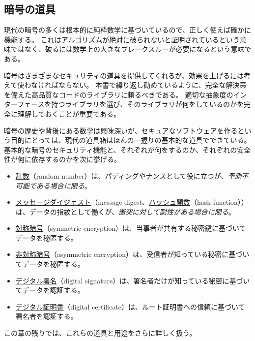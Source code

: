 \documentclass[uplatex]{jsarticle}
\def\label#1{}%
\begin{document}
\subsection{暗号の道具}

現代の暗号の多くは根本的に純粋数学に基づいているので、正しく使えば確かに機能する。
これはアルゴリズムが絶対に破られないと証明されているという意味ではなく、破るには数学上の大きなブレークスルーが必要になるという意味である。

暗号はさまざまなセキュリティの道具を提供してくれるが、効果を上げるには考えて使わなければならない。
本書で繰り返し勧めているように、完全な解決策を備えた高品質なコードのライブラリに頼るべきである。
適切な抽象度のインターフェースを持つライブラリを選び、そのライブラリが何をしているのかを完全に理解しておくことが重要である。

暗号の歴史や背後にある数学は興味深いが、セキュアなソフトウェアを作るという目的にとっては、現代の道具箱はほんの一握りの基本的な道具でできている。
基本的な暗号のセキュリティ機能と、それぞれが何をするのか、それぞれの安全性が何に依存するのかを次に挙げる。

\begin{dfn}[基本的な暗号の道具]\label{dfn:ch5-crypto-tools}
\begin{itemize}
\item \underline{乱数}（random number）は、パディングやナンスとして役に立つが、\emph{予測不可能である場合に限る}。
\item \underline{メッセージダイジェスト}（message digest、\underline{ハッシュ関数}（hash function））は、データの指紋として働くが、\emph{衝突に対して耐性がある場合に限る}。
\item \underline{対称暗号}（symmetric encryption）は、当事者が共有する秘密鍵に基づいてデータを秘匿する。
\item \underline{非対称暗号}（asymmetric encryption）は、受信者が知っている秘密に基づいてデータを秘匿する。
\item \underline{デジタル署名}（digital signature）は、署名者だけが知っている秘密に基づいてデータを認証する。
\item \underline{デジタル証明書}（digital certificate）は、ルート証明書への信頼に基づいて署名者を認証する。
\end{itemize}
\end{dfn}

この章の残りでは、これらの道具と用途をさらに詳しく扱う。

\end{document}

